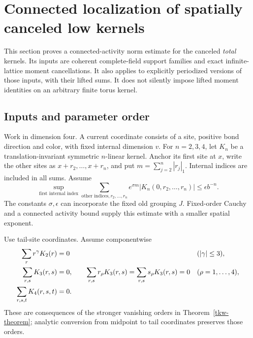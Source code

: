 \section{Connected localization of spatially canceled low kernels}
\label{lst-section}

This section proves a connected-activity norm estimate for the
canceled \emph{total} kernels. Its inputs are coherent complete-field
support families and exact infinite-lattice moment cancellations.
It also applies to explicitly periodized versions of those inputs,
with their lifted sums. It does not silently impose lifted moment
identities on an arbitrary finite torus kernel.

\subsection{Inputs and parameter order}
\label{lst-input-section}

Work in dimension four. A current coordinate consists of a site,
positive bond direction and color, with fixed internal dimension \(v\).
For \(n=2,3,4\), let \(K_n\) be a translation-invariant symmetric
\(n\)-linear kernel. Anchor its first site at \(x\), write the other
sites as \(x+r_2,\ldots,x+r_n\), and put
\(m=\sum_{j=2}^n|r_j|_1\). Internal indices are included in all sums.
Assume
\begin{equation}
 \sup_{\text{first internal index}}
 \sum_{\text{other indices},r_2,\ldots,r_n}
       e^{\sigma m}|K_n(0,r_2,\ldots,r_n)|
       \le \epsilon b^{-n}.
 \label{lst-kernel-bound}
\end{equation}
The constants \(\sigma,\epsilon\) can incorporate the fixed old
grouping \(J\). Fixed-order Cauchy and a connected activity bound
supply this estimate with a smaller spatial exponent.

Use tail-site coordinates. Assume componentwise
\begin{align}
 \sum_r r^\gamma K_2(r)&=0
                          &&(|\gamma|\le3),\notag\\
 \sum_{r,s}K_3(r,s)&=0,\qquad
 \sum_{r,s}r_\rho K_3(r,s)=
 \sum_{r,s}s_\rho K_3(r,s)=0
                          &&(\rho=1,\ldots,4),\notag\\
 \sum_{r,s,t}K_4(r,s,t)&=0.
 \label{lst-moments}
\end{align}
These are consequences of the stronger vanishing orders in
Theorem~\ref{tkw-theorem}; analytic conversion from midpoint
to tail coordinates preserves those orders.

